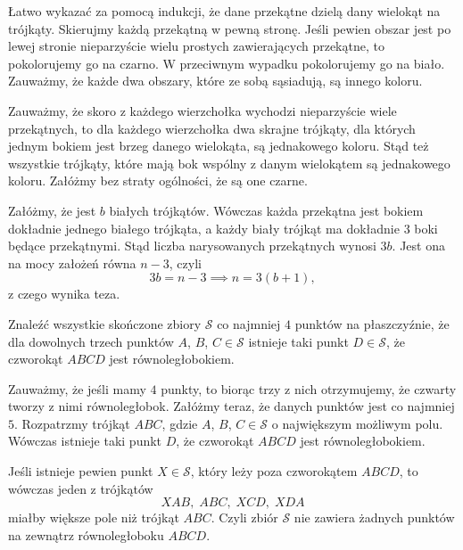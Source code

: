 \noindent
Łatwo wykazać za pomocą indukcji, że dane przekątne dzielą dany wielokąt na trójkąty. Skierujmy każdą przekątną w pewną stronę. Jeśli pewien obszar jest po lewej stronie nieparzyście wielu prostych zawierających przekątne, to pokolorujemy go na czarno. W przeciwnym wypadku pokolorujemy go na biało. Zauważmy, że każde dwa obszary, które ze sobą sąsiadują, są innego koloru.

\vspace{10px}
\noindent
Zauważmy, że skoro z każdego wierzchołka wychodzi nieparzyście wiele przekątnych, to dla każdego wierzchołka dwa skrajne trójkąty, dla których jednym bokiem jest brzeg danego wielokąta, są jednakowego koloru. Stąd też wszystkie trójkąty, które mają bok wspólny z danym wielokątem są jednakowego koloru. Załóżmy bez straty ogólności, że są one czarne.

\vspace{10px}
\noindent
Załóżmy, że jest $b$ białych trójkątów. Wówczas każda przekątna jest bokiem dokładnie jednego białego trójkąta, a każdy biały trójkąt ma dokładnie $3$ boki będące przekątnymi. Stąd liczba narysowanych przekątnych wynosi $3b$. Jest ona na mocy założeń równa $n - 3$, czyli
\[
	3b = n - 3 \implies n = 3(b + 1),
\]
z czego wynika teza.

\begin{problem}{6}
	Znaleźć wszystkie skończone zbiory $\mathcal{S}$ co najmniej $4$ punktów na płaszczyźnie, że dla dowolnych trzech punktów $A$, $B$, $C \in \mathcal{S}$ istnieje taki punkt $D \in \mathcal{S}$, że czworokąt $ABCD$ jest równoległobokiem.
\end{problem}



\noindent
Zauważmy, że jeśli mamy $4$ punkty, to biorąc trzy z nich otrzymujemy, że czwarty tworzy z nimi równoległobok. Załóżmy teraz, że danych punktów jest co najmniej $5$. Rozpatrzmy trójkąt $ABC$, gdzie $A$, $B$, $C \in \mathcal{S}$ o największym możliwym polu. Wówczas istnieje taki punkt $D$, że czworokąt $ABCD$ jest równoległobokiem.

\vspace{10px}
\noindent
Jeśli istnieje pewien punkt $X \in \mathcal{S}$, który leży poza czworokątem $ABCD$, to wówczas jeden z trójkątów
\[
	XAB, \; ABC, \; XCD, \; XDA
\]
miałby większe pole niż trójkąt $ABC$. Czyli zbiór $\mathcal{S}$ nie zawiera żadnych punktów na zewnątrz równoległoboku $ABCD$.

